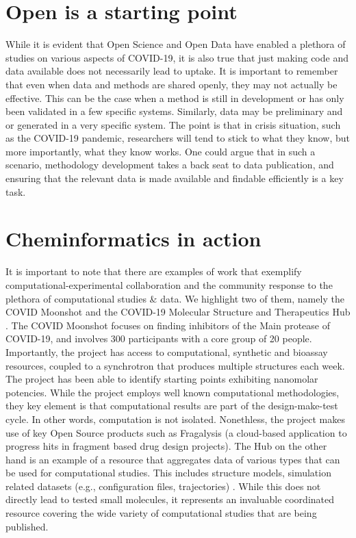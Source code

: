 \documentclass{bmcart}
\begin{document}
\section*{Open is a starting point}

While it is evident that Open Science and Open Data have enabled a
plethora of studies on various aspects of COVID-19, it is also true
that just making code and data available does not necessarily lead to
uptake. It is important to remember that
even when data and methods are shared openly, they may not actually be
effective. This can be the case when a method is still in development
or has only been validated in a few specific systems. Similarly, data
may be preliminary and or generated in a very specific system. The
point is that in crisis situation, such as the COVID-19 pandemic,
researchers will tend to stick to what they know, but more
importantly, what they know works. One could argue that in such a
scenario, methodology development takes a back seat to data
publication, and ensuring that the relevant data is made available and
findable efficiently is a key task.

\section*{Cheminformatics in action}
\label{sec:chem-acti}

It is important to note that there are examples of work that exemplify
computational-experimental collaboration and the community response to
the plethora of computational studies \& data. We highlight two of
them, namely the COVID Moonshot \cite{moonshot} and the COVID-19
Molecular Structure and Therapeutics Hub \cite{molssi}. The COVID
Moonshot focuses on finding inhibitors of the Main protease of
COVID-19, and involves 300 participants with a core group of 20
people. Importantly, the project has access to computational,
synthetic and bioassay resources, coupled to a synchrotron that
produces multiple structures each week. The project has been able to
identify starting points exhibiting nanomolar potencies. While the
project employs well known computational methodologies, they key
element is that computational results are part of the design-make-test
cycle. In other words, computation is not isolated. Nonethless, the
project makes use of key Open Source products such as Fragalysis (a
cloud-based application to progress hits in fragment based drug design
projects). The Hub on the other hand is an example of a resource that
aggregates data of various types that can be used for computational
studies. This includes structure models, simulation related datasets
(e.g., configuration files, trajectories) . While this does not
directly lead to tested small molecules, it represents an invaluable
coordinated resource covering the wide variety of computational
studies that are being published.
\end{document}
